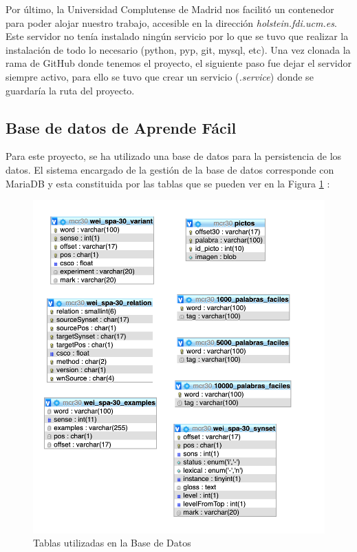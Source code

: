 Por último, la Universidad Complutense de Madrid nos facilitó un contenedor para poder alojar nuestro trabajo, accesible en la dirección \textit{holstein.fdi.ucm.es}. Este servidor no tenía instalado ningún servicio por lo que se tuvo que realizar la instalación de todo lo necesario (python, pyp, git, mysql, etc). Una vez clonada la rama de GitHub donde tenemos el proyecto, el siguiente paso fue dejar el servidor siempre activo, para ello se tuvo que crear un servicio (\textit{.service}) donde se guardaría la ruta del proyecto.

\subsection{Base de datos de Aprende Fácil}
\label{cap:subsec:database}

Para este proyecto, se ha utilizado una base de datos para la persistencia de los datos. El sistema encargado de la gestión de la base de datos corresponde con MariaDB y esta constituida por las tablas que se pueden ver en la Figura \ref{fig:tablasBBDD} :

\begin{figure}[!h]
	\includegraphics[width=.8\textwidth]{Imagenes/Bitmap/Capitulo4/tablasBBDD.png}
	\centering
	\caption{Tablas utilizadas en la Base de Datos}
	\label{fig:tablasBBDD}
\end{figure}

